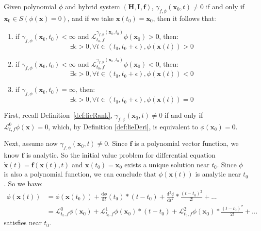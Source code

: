 \documentclass{jssc}
\begin{document}
\begin{theorem}
\label{thm:lieDeri}
Given polynomial $\phi$ and hybrid system $(\boldsymbol{H}, \boldsymbol{I}, \boldsymbol{f})$, $\gamma_{f, \phi}(\boldsymbol{x}_0, t) \neq 0$ if and only if $\boldsymbol{x}_0 \in S(\phi(\boldsymbol{x}) = 0)$,  and if we take $\boldsymbol{x}(t_0) = \boldsymbol{x}_0$, then it follows that: 
\begin{enumerate}
	\item if $\gamma_{f, \phi}(\boldsymbol{x}_0, t_0) < \infty$ and $\mathcal{L}_{t_0, f}^{\gamma_{f, \phi}(\boldsymbol{x}_0, t_0)} \phi (\boldsymbol{x}_0) > 0$, then:
		\begin{equation*}
			\exists \epsilon > 0, \forall t \in (t_0, t_0 + \epsilon),\phi (\boldsymbol{x}(t)) > 0
		\end{equation*}
	\item if $\gamma_{f, \phi}(\boldsymbol{x}_0, t_0) < \infty$ and $\mathcal{L}_{t_0, f}^{\gamma_{f, \phi}(\boldsymbol{x}_0, t_0)} \phi (\boldsymbol{x}_0) < 0$, then:
		\begin{equation*}
			\exists \epsilon > 0, \forall t \in (t_0, t_0 + \epsilon),\phi (\boldsymbol{x}(t)) < 0
		\end{equation*}
	\item if $\gamma_{f, \phi}(\boldsymbol{x}_0, t_0) = \infty$, then:
		\begin{equation*}
			\exists \epsilon > 0, \forall t \in (t_0, t_0 + \epsilon),\phi (\boldsymbol{x}(t)) = 0
		\end{equation*}
\end{enumerate}
\end{theorem}

\proof
First, recall Definition~\ref{def:lieRank}, $\gamma_{f, \phi}(\boldsymbol{x}_0, t) \neq 0$ if and only if $\mathcal{L}_{t, f}^0 \phi (\boldsymbol{x}) = 0$, which, by Definition \ref{def:lieDeri}, is equivalent to $\phi(\boldsymbol{x}_0) = 0$. 

Next, assume now $\gamma_{f, \phi}(\boldsymbol{x}_0, t) \neq 0$. Since $\boldsymbol{f}$ is a polynomial vector function, we know $\boldsymbol{f}$ is analytic. So the initial value problem for differential equation $\dot{\boldsymbol{x}}(t) = \boldsymbol{f}(\boldsymbol{x}(t),t)$ and $\boldsymbol{x}(t_0) = \boldsymbol{x}_0$ exists a unique solution near $t_0$\cite{tenenbaum1963ordinary}. Since $\phi$ is also a polynomial function, we can conclude that $\phi(\boldsymbol{x}(t))$ is analytic near $t_0$. So we have: 
	\begin{equation*}
		\begin{split}
		\phi(\boldsymbol{x}(t)) &= \phi(\boldsymbol{x}(t_0)) + \frac{\mathrm{d} \phi}{\mathrm{d}t}(t_0) * (t-t_0) + \frac{\mathrm{d}^2 \phi}{\mathrm{d}t^2} * \frac{(t-t_0)^2}{2!} + \dots \\
							&= {\mathcal{L}_{t_0, f}^0 \phi(\boldsymbol{x}_0)} + \mathcal{L}_{t_0, f}^1 \phi(\boldsymbol{x}_0) * (t-t_0) + \mathcal{L}_{t_0, f}^2 \phi(\boldsymbol{x}_0) * \frac{(t-t_0)^2}{2!} + \dots
		\end{split}
	\end{equation*}
satisfies near $t_0$.
\end{document}
